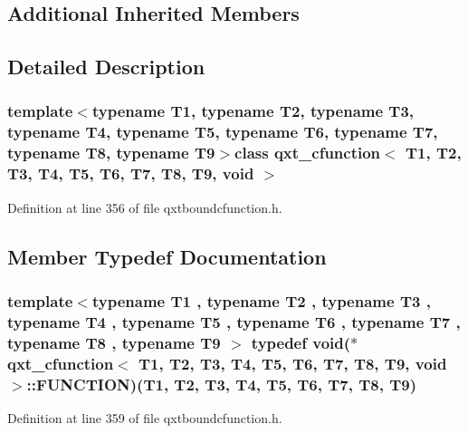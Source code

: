 \subsection*{Additional Inherited Members}


\subsection{Detailed Description}
\subsubsection*{template$<$typename T1, typename T2, typename T3, typename T4, typename T5, typename T6, typename T7, typename T8, typename T9$>$class qxt\-\_\-cfunction$<$ T1, T2, T3, T4, T5, T6, T7, T8, T9, void $>$}



Definition at line 356 of file qxtboundcfunction.\-h.



\subsection{Member Typedef Documentation}
\hypertarget{classqxt__cfunction_3_01_t1_00_01_t2_00_01_t3_00_01_t4_00_01_t5_00_01_t6_00_01_t7_00_01_t8_00_01_t9_00_01void_01_4_a9bbc92788fe93f2612ab8658a78a8769}{
\subsubsection[{F\-U\-N\-C\-T\-I\-O\-N}]{\setlength{\rightskip}{0pt plus 5cm}template$<$typename T1 , typename T2 , typename T3 , typename T4 , typename T5 , typename T6 , typename T7 , typename T8 , typename T9 $>$ typedef {\bf void}($\ast$ {\bf qxt\-\_\-cfunction}$<$ T1, T2, T3, T4, T5, T6, T7, T8, T9, {\bf void} $>$\-::F\-U\-N\-C\-T\-I\-O\-N)(T1, T2, T3, T4, T5, T6, T7, T8, T9)}}\label{classqxt__cfunction_3_01_t1_00_01_t2_00_01_t3_00_01_t4_00_01_t5_00_01_t6_00_01_t7_00_01_t8_00_01_t9_00_01void_01_4_a9bbc92788fe93f2612ab8658a78a8769}


Definition at line 359 of file qxtboundcfunction.\-h.



